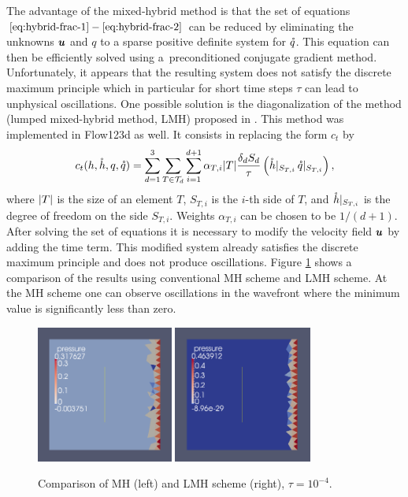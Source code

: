 The advantage of the mixed-hybrid method is that the set of equations $\eqref{eq:hybrid-frac-1} - 
\eqref{eq:hybrid-frac-2}$ can be reduced by eliminating the unknowns $\mathbf{\boldsymbol{u}}$ and $q$
to a sparse positive definite system for $\mathring q$.
This equation can then be efficiently solved using a~preconditioned conjugate gradient method.
Unfortunately, it appears that the resulting system does not satisfy the discrete maximum principle
 which in particular for short time steps $\tau$ can lead to unphysical oscillations.
One possible solution is the diagonalization of the method (lumped mixed-hybrid method, LMH)
 proposed in \cite{younes_2006}.
This method was implemented in Flow123d as well.
It consists in replacing the form $c_t$ by
\[
    c_t(h, \mathring h, q, \mathring q)= \sum_{d=1}^{3}\sum_{T\in \mathcal T_d}
        \sum_{i=1}^{d+1} \alpha_{T,i} \lvert T\rvert \frac{\delta_d S_d}{\tau} 
        \left(\mathring h|_{S_{T,i}}\,  \mathring q|_{S_{T,i}}\right),
\]
where $\lvert T\rvert$ is the size of an element $T$, $S_{T,i}$ is the $i$-th side of $T$, and 
$\mathring h|_{S_{T,i}}$ is the degree of freedom on the side $S_{T,i}$. 
Weights $\alpha_{T,i}$ can be chosen to be $1/(d+1)$. 
After solving the set of equations it is necessary to modify the velocity field $\mathbf{\boldsymbol{u}}$
 by adding the time term.
This modified system already satisfies the discrete maximum principle
 and does not produce oscillations.
Figure \ref{fig:LMH} shows a comparison of the results
 using conventional MH scheme and LMH scheme.
At the MH scheme one can observe oscillations in the wavefront
 where the minimum value is significantly less than zero.

\begin{figure}
    \begin{center}
       \includegraphics[width=0.4\textwidth]{figures/MH.png}
       \includegraphics[width=0.405\textwidth]{figures/LMH.png}        
    \end{center}
    \caption{Comparison of MH (left) and LMH scheme (right), $\tau=10^{-4}$.}
    \label{fig:LMH}
\end{figure}

